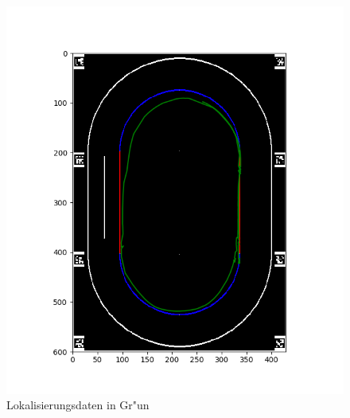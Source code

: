 \documentclass[10pt,oneside,a4paper]{article}
\begin{document}
    \begin{figure}[h]
      \centering
      \includegraphics[scale=0.9]{pictures/map_with_localization.png}
      \caption{Lokalisierungsdaten in Gr"un}
    \end{figure}
\end{document}
